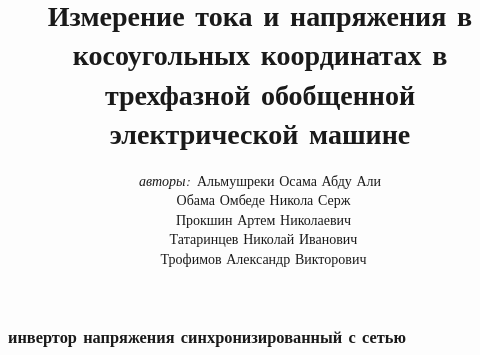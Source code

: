\newcommand{\itemi}{\item[\checkmark]}


\title{\small{Измерение тока и напряжения в косоугольных координатах в трехфазной обобщенной электрической машине }}
\author{\small{%
\emph{авторы:}~Альмушреки Осама Абду Али\\
\emph{}~Обама Омбеде Никола Серж\\
\emph{}~Прокшин Артем Николаевич\\%
\emph{}~Татаринцев Николай Иванович\\
\emph{}~Трофимов Александр Викторович}}



\vspace{30pt}%

\vspace{60pt}%

\AdvanceDate[-1] %


\begin{frame}
\titlepage	
\end{frame}


\begin{frame}
\frametitle{\small инвертор напряжения синхронизированный с сетью}
	\vspace{-1cm}
\begin{figure}[!ht]

\end{figure}
\end{frame}


